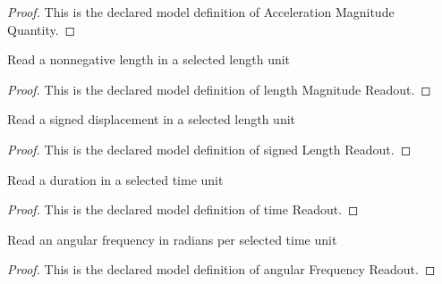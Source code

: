 \begin{proof}
  This is the declared model definition of Acceleration Magnitude Quantity.
\end{proof}
\begin{definition}
  \label{def:physics:phyx-mini-0273:phyxminiproblems-problemphyxmini0273-lengthmagnitudereadout}
  Read a nonnegative length in a selected length unit
\end{definition}
\begin{proof}
  This is the declared model definition of length Magnitude Readout.
\end{proof}
\begin{definition}
  \label{def:physics:phyx-mini-0273:phyxminiproblems-problemphyxmini0273-signedlengthreadout}
  Read a signed displacement in a selected length unit
\end{definition}
\begin{proof}
  This is the declared model definition of signed Length Readout.
\end{proof}
\begin{definition}
  \label{def:physics:phyx-mini-0273:phyxminiproblems-problemphyxmini0273-timereadout}
  Read a duration in a selected time unit
\end{definition}
\begin{proof}
  This is the declared model definition of time Readout.
\end{proof}
\begin{definition}
  \label{def:physics:phyx-mini-0273:phyxminiproblems-problemphyxmini0273-angularfrequencyreadout}
  Read an angular frequency in radians per selected time unit
\end{definition}
\begin{proof}
  This is the declared model definition of angular Frequency Readout.
\end{proof}
